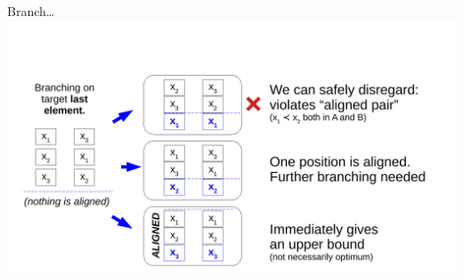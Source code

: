 \documentclass[10pt, xcolor=svgnames]{beamer}
\begin{document}
\begin{frame}[label={sec:org2bab7b5}]{Branch\ldots{}}
\includegraphics[width=\textwidth]{./img/BB.pdf}
\end{frame}
\end{document}

